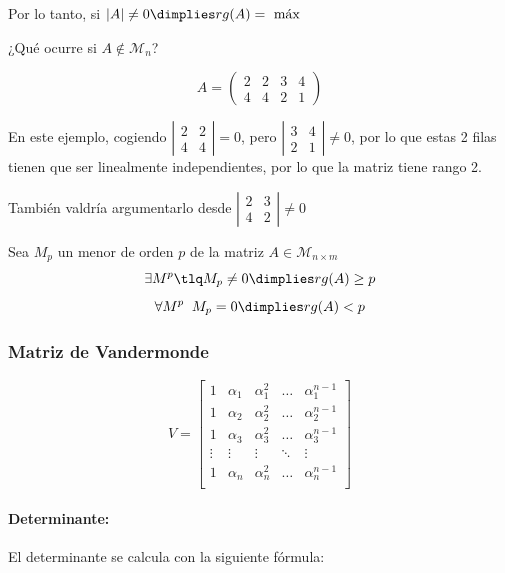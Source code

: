 Por lo tanto, si $|A|\neq 0 \dimplies rg(A) = \text{ máx}$

¿Qué ocurre si $A\not\in\mathcal{M}_n$?

\begin{example}
\[
    A=\begin{pmatrix}2&2&3&4\\4&4&2&1\end{pmatrix}
\]

En este ejemplo, cogiendo $\left|\begin{matrix}2&2\\4&4\end{matrix}\right| = 0$, pero $\left|\begin{matrix}3&4\\2&1\end{matrix}\right| \neq 0$, por lo que estas 2 filas tienen que ser linealmente independientes, por lo que la matriz tiene rango 2.

También valdría argumentarlo desde $\left|\begin{matrix}2&3\\4&2\end{matrix}\right| \neq 0$
\end{example}

\begin{prop}
Sea $M_p$ un menor de orden $p$ de la matriz $A\in\mathcal{M}_{n\times m}$
\[\exists M^p \tlq M_p \neq 0 \dimplies rg(A) \geq p\]
\[\forall M^p \;\; M_p = 0 \dimplies rg(A) < p\]
\end{prop}

\subsubsection{Matriz de Vandermonde}
\[
V=\begin{bmatrix}
1 & \alpha_1 & \alpha_1^2 & \dots & \alpha_1^{n-1}\\
1 & \alpha_2 & \alpha_2^2 & \dots & \alpha_2^{n-1}\\
1 & \alpha_3 & \alpha_3^2 & \dots & \alpha_3^{n-1}\\
\vdots & \vdots & \vdots & \ddots &\vdots \\
1 & \alpha_n & \alpha_n^2 & \dots & \alpha_n^{n-1}\\
\end{bmatrix}\]

\paragraph{Determinante: } El determinante se calcula con la siguiente fórmula:

